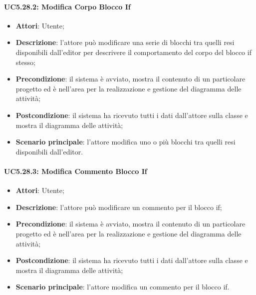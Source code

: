 \paragraph{UC5.28.2: Modifica Corpo Blocco If}
\label{UC5.28.2}
\begin{itemize}
	\item \textbf{Attori}: Utente;
	\item \textbf{Descrizione}: l'attore può modificare una serie di blocchi tra quelli resi disponibili dall'editor per descrivere il comportamento del corpo del blocco if stesso;
	\item \textbf{Precondizione}: il sistema è avviato, mostra il contenuto di un particolare progetto ed è nell'area per la realizzazione e gestione del diagramma delle attività;
	\item \textbf{Postcondizione}: il sistema ha ricevuto tutti i dati dall'attore sulla classe e mostra il diagramma delle attività;
	\item \textbf{Scenario principale}: l'attore modifica uno o più blocchi tra quelli resi disponibili dall'editor.
\end{itemize}

\paragraph{UC5.28.3: Modifica Commento Blocco If}
\label{UC5.28.3}
\begin{itemize}
	\item \textbf{Attori}: Utente;
	\item \textbf{Descrizione}: l'attore può modificare un commento per il blocco if;
	\item \textbf{Precondizione}: il sistema è avviato, mostra il contenuto di un particolare progetto ed è nell'area per la realizzazione e gestione del diagramma delle attività;
	\item \textbf{Postcondizione}: il sistema ha ricevuto tutti i dati dall'attore sulla classe e mostra il diagramma delle attività;
	\item \textbf{Scenario principale}: l'attore modifica un commento per il blocco if.
\end{itemize}

